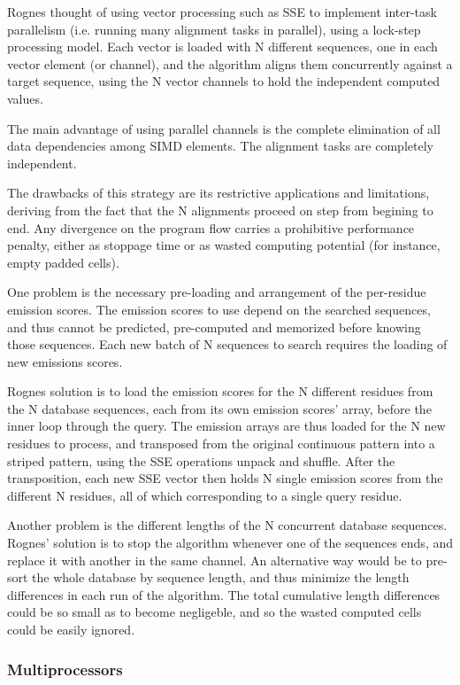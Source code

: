 Rognes thought of using vector processing such as SSE to implement inter-task parallelism (i.e. running many alignment tasks in parallel), using a lock-step processing model. Each vector is loaded with N different sequences, one in each vector element (or channel), and the algorithm aligns them concurrently against a target sequence, using the N vector channels to hold the independent computed values. 

The main advantage of using parallel channels is the complete elimination of all data dependencies among SIMD elements. The alignment tasks are completely independent.

The drawbacks of this strategy are its restrictive applications and limitations, deriving from the fact that the N alignments proceed on step from begining to end. Any divergence on the program flow carries a prohibitive performance penalty, either as stoppage time or as wasted computing potential (for instance, empty padded cells).

One problem is the necessary pre-loading and arrangement of the per-residue emission scores. The emission scores to use depend on the searched sequences, and thus cannot be predicted, pre-computed and memorized before knowing those sequences. Each new batch of N sequences to search requires the loading of new emissions scores.

Rognes solution is to load the emission scores for the N different residues from the N database sequences, each from its own emission scores' array, before the inner loop through the query. The emission arrays are thus loaded for the N new residues to process, and transposed from the original continuous pattern into a striped pattern, using the SSE operations unpack and shuffle. After the transposition, each new SSE vector then holds N single emission scores from the different N residues, all of which corresponding to a single query residue.

Another problem is the different lengths of the N concurrent database sequences. Rognes' solution is to stop the algorithm whenever one of the sequences ends, and replace it with another in the same channel. An alternative way would be to pre-sort the whole database by sequence length, and thus minimize the length differences in each run of the algorithm. The total cumulative length differences could be so small as to become negligeble, and so the wasted computed cells could be easily ignored.



\subsubsection{Multiprocessors}

